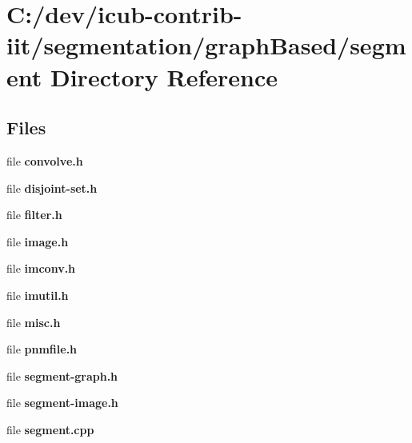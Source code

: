 \section{C\+:/dev/icub-\/contrib-\/iit/segmentation/graph\+Based/segment Directory Reference}
\label{dir_8a973a77effdd5e8e5ebda63e606cd67}
\subsection*{Files}
\begin{DoxyCompactItemize}
\item 
file {\bfseries convolve.\+h}
\item 
file {\bfseries disjoint-\/set.\+h}
\item 
file {\bfseries filter.\+h}
\item 
file {\bfseries image.\+h}
\item 
file {\bfseries imconv.\+h}
\item 
file {\bfseries imutil.\+h}
\item 
file {\bfseries misc.\+h}
\item 
file {\bfseries pnmfile.\+h}
\item 
file {\bfseries segment-\/graph.\+h}
\item 
file {\bfseries segment-\/image.\+h}
\item 
file {\bfseries segment.\+cpp}
\end{DoxyCompactItemize}
